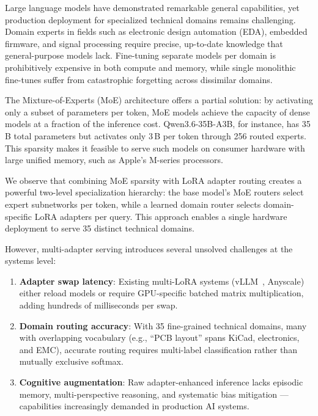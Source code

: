 \documentclass[11pt,a4paper]{article}
\begin{document}
Large language models have demonstrated remarkable general capabilities, yet production deployment for specialized technical domains remains challenging. Domain experts in fields such as electronic design automation (EDA), embedded firmware, and signal processing require precise, up-to-date knowledge that general-purpose models lack. Fine-tuning separate models per domain is prohibitively expensive in both compute and memory, while single monolithic fine-tunes suffer from catastrophic forgetting across dissimilar domains.

The Mixture-of-Experts (MoE) architecture offers a partial solution: by activating only a subset of parameters per token, MoE models achieve the capacity of dense models at a fraction of the inference cost. Qwen3.6-35B-A3B, for instance, has 35\,B total parameters but activates only 3\,B per token through 256 routed experts. This sparsity makes it feasible to serve such models on consumer hardware with large unified memory, such as Apple's M-series processors.

We observe that combining MoE sparsity with LoRA adapter routing creates a powerful two-level specialization hierarchy: the base model's MoE routers select expert subnetworks per token, while a learned domain router selects domain-specific LoRA adapters per query. This approach enables a single hardware deployment to serve 35 distinct technical domains.

However, multi-adapter serving introduces several unsolved challenges at the systems level:
\begin{enumerate}[nosep]
  \item \textbf{Adapter swap latency}: Existing multi-LoRA systems (vLLM~\citep{kwon2023efficient}, Anyscale) either reload models or require GPU-specific batched matrix multiplication, adding hundreds of milliseconds per swap.
  \item \textbf{Domain routing accuracy}: With 35 fine-grained technical domains, many with overlapping vocabulary (e.g., ``PCB layout'' spans KiCad, electronics, and EMC), accurate routing requires multi-label classification rather than mutually exclusive softmax.
  \item \textbf{Cognitive augmentation}: Raw adapter-enhanced inference lacks episodic memory, multi-perspective reasoning, and systematic bias mitigation --- capabilities increasingly demanded in production AI systems.
\end{enumerate}
\end{document}
